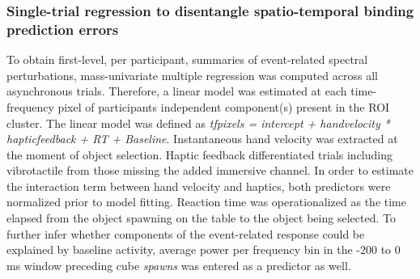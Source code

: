 \subsubsection{Single-trial regression to disentangle spatio-temporal binding prediction errors}
To obtain first-level, per participant, summaries of event-related spectral perturbations, mass-univariate multiple regression was computed across all asynchronous trials. Therefore, a linear model was estimated at each time-frequency pixel of participants independent component(s) present in the ROI cluster. The linear model was defined as \textit{tf\textunderscore pixels = intercept + hand\textunderscore velocity * haptic\textunderscore feedback + RT + Baseline}. Instantaneous hand velocity was extracted at the moment of object selection. Haptic feedback differentiated trials including vibrotactile from those missing the added immersive channel. In order to estimate the interaction term between hand velocity and haptics, both predictors were normalized prior to model fitting. Reaction time was operationalized as the time elapsed from the object spawning on the table to the object being selected. To further infer whether components of the event-related response could be explained by baseline activity, average power per frequency bin in the -200 to 0 ms window preceding cube \textit{spawns} was entered as a predictor as well.

